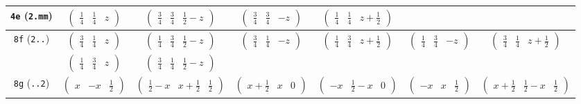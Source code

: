 \documentclass[fleqn,9pt,landscape]{jsarticle}
\begin{document}
\begin{center}
\begin{longtable}{ccccccc}
{\tt 4e} ({\tt 2.mm}) & $ \begin{pmatrix} \frac{1}{4} & \frac{1}{4} & z \end{pmatrix} $ & $ \begin{pmatrix} \frac{3}{4} & \frac{3}{4} & \frac{1}{2} - z \end{pmatrix} $ & $ \begin{pmatrix} \frac{3}{4} & \frac{3}{4} & - z \end{pmatrix} $ & $ \begin{pmatrix} \frac{1}{4} & \frac{1}{4} & z + \frac{1}{2} \end{pmatrix} $ & $  $ & $  $ \\ \hline
{\tt 8f} ({\tt 2..}) & $ \begin{pmatrix} \frac{3}{4} & \frac{1}{4} & z \end{pmatrix} $ & $ \begin{pmatrix} \frac{1}{4} & \frac{3}{4} & \frac{1}{2} - z \end{pmatrix} $ & $ \begin{pmatrix} \frac{3}{4} & \frac{1}{4} & - z \end{pmatrix} $ & $ \begin{pmatrix} \frac{1}{4} & \frac{3}{4} & z + \frac{1}{2} \end{pmatrix} $ & $ \begin{pmatrix} \frac{1}{4} & \frac{3}{4} & - z \end{pmatrix} $ & $ \begin{pmatrix} \frac{3}{4} & \frac{1}{4} & z + \frac{1}{2} \end{pmatrix} $ \\
& $ \begin{pmatrix} \frac{1}{4} & \frac{3}{4} & z \end{pmatrix} $ & $ \begin{pmatrix} \frac{3}{4} & \frac{1}{4} & \frac{1}{2} - z \end{pmatrix} $ & $  $ & $  $ & $  $ & $  $ \\ \hline
{\tt 8g} ({\tt ..2}) & $ \begin{pmatrix} x & - x & \frac{1}{2} \end{pmatrix} $ & $ \begin{pmatrix} \frac{1}{2} - x & x + \frac{1}{2} & \frac{1}{2} \end{pmatrix} $ & $ \begin{pmatrix} x + \frac{1}{2} & x & 0 \end{pmatrix} $ & $ \begin{pmatrix} - x & \frac{1}{2} - x & 0 \end{pmatrix} $ & $ \begin{pmatrix} - x & x & \frac{1}{2} \end{pmatrix} $ & $ \begin{pmatrix} x + \frac{1}{2} & \frac{1}{2} - x & \frac{1}{2} \end{pmatrix} $ \\

\end{longtable}
\end{center}
\end{document}

